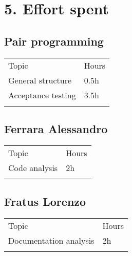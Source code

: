 \chapter{5. Effort spent}

\section{Pair programming}

\begin{longtable}[]{@{}
  >{\raggedright\arraybackslash}p{}
  >{\raggedleft\arraybackslash}p{}@{}}
\toprule
Topic & Hours \\ \addlinespace
\midrule
\endhead
General structure & 0.5h \\ \addlinespace
Acceptance testing & 3.5h \\ \addlinespace
\bottomrule
\end{longtable}

\section{Ferrara Alessandro}

\begin{longtable}[]{@{}
  >{\raggedright\arraybackslash}p{}
  >{\raggedleft\arraybackslash}p{}@{}}
\toprule
Topic & Hours \\ \addlinespace
\midrule
\endhead
Code analysis & 2h \\ \addlinespace
\bottomrule
\end{longtable}

\section{Fratus Lorenzo}

\begin{longtable}[]{@{}
  >{\raggedright\arraybackslash}p{}
  >{\raggedleft\arraybackslash}p{}@{}}
\toprule
Topic & Hours \\ \addlinespace
\midrule
\endhead
Documentation analysis & 2h \\ \addlinespace
\bottomrule
\end{longtable}

